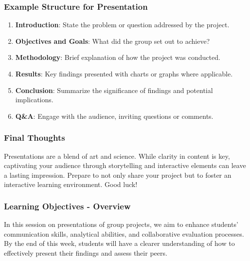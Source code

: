 \documentclass{beamer}
\begin{document}
\begin{frame}[fragile]
    \frametitle{Example Structure for Presentation}
    \begin{enumerate}
        \item \textbf{Introduction}: State the problem or question addressed by the project.
        \item \textbf{Objectives and Goals}: What did the group set out to achieve?
        \item \textbf{Methodology}: Brief explanation of how the project was conducted.
        \item \textbf{Results}: Key findings presented with charts or graphs where applicable.
        \item \textbf{Conclusion}: Summarize the significance of findings and potential implications.
        \item \textbf{Q\&A}: Engage with the audience, inviting questions or comments.
    \end{enumerate}
\end{frame}

\begin{frame}[fragile]
    \frametitle{Final Thoughts}
    Presentations are a blend of art and science. While clarity in content is key, captivating your audience through storytelling and interactive elements can leave a lasting impression. Prepare to not only share your project but to foster an interactive learning environment. Good luck!
\end{frame}

\begin{frame}[fragile]
    \frametitle{Learning Objectives - Overview}
    In this session on presentations of group projects, we aim to enhance students’ communication skills, analytical abilities, and collaborative evaluation processes. By the end of this week, students will have a clearer understanding of how to effectively present their findings and assess their peers.
\end{frame}
\end{document}
